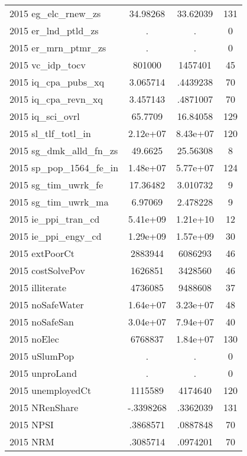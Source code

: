 {\begin{tabular}{l*{1}{ccc}}
2015 eg\_elc\_rnew\_zs &    34.98268&    33.62039&         131\\
2015 er\_lnd\_ptld\_zs &           .&           .&           0\\
2015 er\_mrn\_ptmr\_zs &           .&           .&           0\\
2015 vc\_idp\_tocv    &      801000&     1457401&          45\\
2015 iq\_cpa\_pubs\_xq &    3.065714&    .4439238&          70\\
2015 iq\_cpa\_revn\_xq &    3.457143&    .4871007&          70\\
2015 iq\_sci\_ovrl    &     65.7709&    16.84058&         129\\
2015 sl\_tlf\_totl\_in &    2.12e+07&    8.43e+07&         120\\
2015 sg\_dmk\_alld\_fn\_zs&     49.6625&    25.56308&           8\\
2015 sp\_pop\_1564\_fe\_in&    1.48e+07&    5.77e+07&         124\\
2015 sg\_tim\_uwrk\_fe &    17.36482&    3.010732&           9\\
2015 sg\_tim\_uwrk\_ma &     6.97069&    2.478228&           9\\
2015 ie\_ppi\_tran\_cd &    5.41e+09&    1.21e+10&          12\\
2015 ie\_ppi\_engy\_cd &    1.29e+09&    1.57e+09&          30\\
2015 extPoorCt      &     2883944&     6086293&          46\\
2015 costSolvePov   &     1626851&     3428560&          46\\
2015 illiterate     &     4736085&     9488608&          37\\
2015 noSafeWater    &    1.64e+07&    3.23e+07&          48\\
2015 noSafeSan      &    3.04e+07&    7.94e+07&          40\\
2015 noElec         &     6768837&    1.84e+07&         130\\
2015 uSlumPop       &           .&           .&           0\\
2015 unproLand      &           .&           .&           0\\
2015 unemployedCt   &     1115589&     4174640&         120\\
2015 NRenShare      &   -.3398268&    .3362039&         131\\
2015 NPSI           &    .3868571&    .0887848&          70\\
2015 NRM            &    .3085714&    .0974201&          70\\

\end{tabular}}
